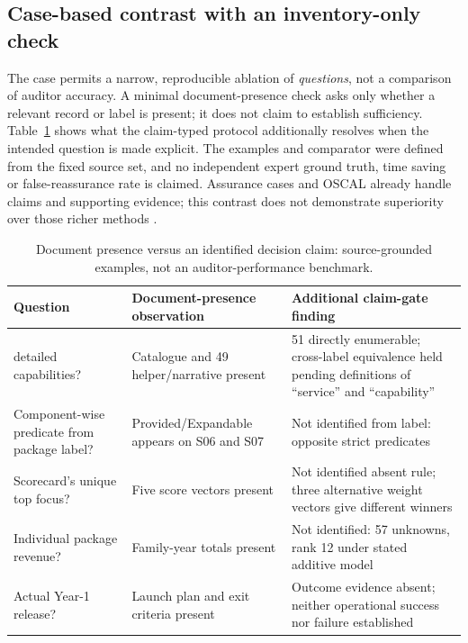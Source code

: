 \documentclass[systems,article,submit,moreauthors]{Definitions/mdpi}
\begin{document}
\subsection{Case-based contrast with an inventory-only check}
The case permits a narrow, reproducible ablation of \emph{questions}, not a comparison of auditor accuracy. A minimal document-presence check asks only whether a relevant record or label is present; it does not claim to establish sufficiency. Table~\ref{tab:contrast} shows what the claim-typed protocol additionally resolves when the intended question is made explicit. The examples and comparator were defined from the fixed source set, and no independent expert ground truth, time saving or false-reassurance rate is claimed. Assurance cases and OSCAL already handle claims and supporting evidence; this contrast does not demonstrate superiority over those richer methods \cite{Mohamad2021,OSCALAR2026,OSCALMapping2026}.
\begin{table}[H]
\centering\footnotesize
\caption{Document presence versus an identified decision claim: source-grounded examples, not an auditor-performance benchmark.}
\label{tab:contrast}
\begin{tabularx}{\linewidth}{>{\raggedright\arraybackslash}p{2.55cm} >{\raggedright\arraybackslash}p{3.15cm} X}
\toprule
Question & Document-presence observation & Additional claim-gate finding \\
\midrule
51 detailed capabilities? & Catalogue and 49 helper/narrative present & 51 directly enumerable; cross-label equivalence held pending definitions of ``service'' and ``capability'' \\
Component-wise predicate from package label? & Provided/Expandable appears on S06 and S07 & Not identified from label: opposite strict predicates \\
Scorecard's unique top focus? & Five score vectors present & Not identified absent rule; three alternative weight vectors give different winners \\
Individual package revenue? & Family-year totals present & Not identified: 57 unknowns, rank 12 under stated additive model \\
Actual Year-1 release? & Launch plan and exit criteria present & Outcome evidence absent; neither operational success nor failure established \\
\bottomrule
\end{tabularx}
\end{table}
\end{document}

